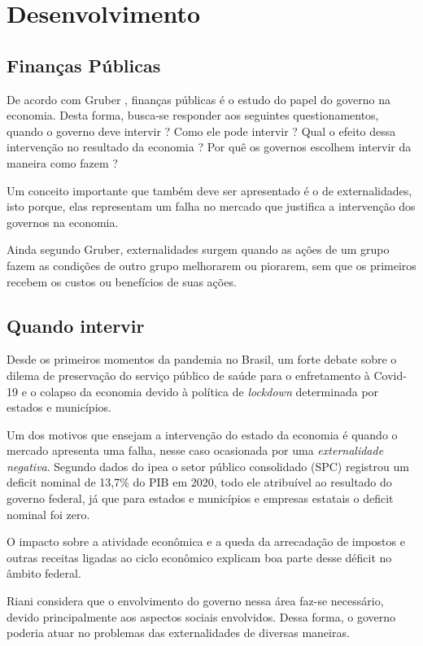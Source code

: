 \section{Desenvolvimento}


\subsection{Finanças Públicas}
De acordo com Gruber \cite{pfpp}, finanças públicas é o estudo do papel do governo na economia. Desta forma, busca-se responder aos seguintes questionamentos, quando o governo deve intervir ? Como ele pode intervir ? Qual o efeito dessa intervenção no resultado da economia ? Por quê os governos escolhem intervir da maneira como fazem ?

Um conceito importante que também deve ser apresentado é o de externalidades, isto porque, elas representam um falha no mercado que justifica a intervenção dos governos na economia.

Ainda segundo Gruber, externalidades surgem quando as ações de um grupo fazem as condições de outro grupo melhorarem ou piorarem, sem que os primeiros recebem os custos ou benefícios de suas ações. 


\subsection{Quando intervir}
Desde os primeiros momentos da pandemia no Brasil, um forte debate sobre o dilema de preservação do serviço público de saúde para o enfretamento à Covid-19 e o colapso da economia devido à política de \emph{lockdown}  determinada por estados e municípios.

Um dos motivos que ensejam a intervenção do estado da economia é quando o mercado apresenta uma falha, nesse caso ocasionada por uma \emph{externalidade negativa}. Segundo dados do ipea \cite{ipea} o setor público consolidado (SPC) registrou um deficit nominal de 13,7\% do PIB em 2020, todo ele atribuível ao resultado do governo federal, já que para estados e municípios e empresas estatais o deficit nominal foi zero.

O impacto sobre a atividade econômica e  a queda da arrecadação de impostos e outras receitas ligadas ao ciclo econômico explicam boa parte desse déficit no âmbito federal.

Riani \cite{riani} considera que o envolvimento do governo nessa área faz-se necessário, devido principalmente aos aspectos sociais envolvidos. Dessa forma, o governo poderia atuar no problemas das externalidades de diversas maneiras.


